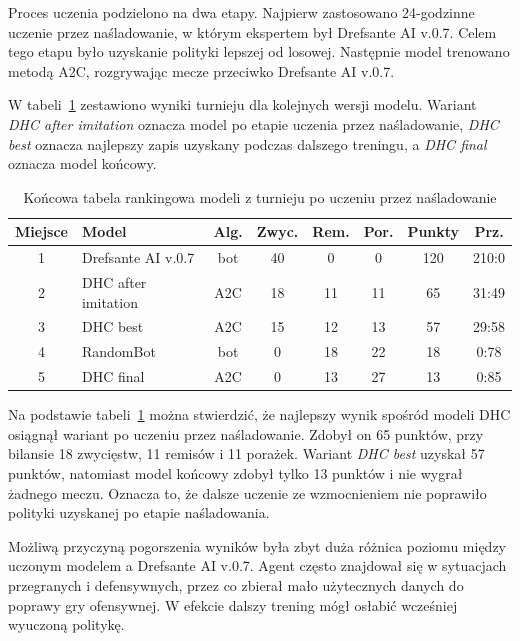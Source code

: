 Proces uczenia podzielono na dwa etapy. Najpierw zastosowano 24-godzinne uczenie przez naśladowanie, w którym ekspertem był Drefsante AI v.0.7. Celem tego etapu było uzyskanie polityki lepszej od losowej. Następnie model trenowano metodą A2C, rozgrywając mecze przeciwko Drefsante AI v.0.7.

W tabeli~\ref{tab:liga-ranking-imitation-vs-final} zestawiono wyniki turnieju dla kolejnych wersji modelu. Wariant \textit{DHC after imitation} oznacza model po etapie uczenia przez naśladowanie, \textit{DHC best} oznacza najlepszy zapis uzyskany podczas dalszego treningu, a \textit{DHC final} oznacza model końcowy.

\begin{table}[H]
	\centering
	\caption{Końcowa tabela rankingowa modeli z turnieju po uczeniu przez naśladowanie}
	\label{tab:liga-ranking-imitation-vs-final}
	\begin{tabular}{clcccccc}
		\hline
		Miejsce & Model & Alg. & Zwyc. & Rem. & Por. & Punkty & Prz. \\
		\hline
		1 & Drefsante AI v.0.7 & bot & 40 & 0 & 0 & 120 & 210:0 \\
		2 & DHC after imitation & A2C & 18 & 11 & 11 & 65 & 31:49 \\
		3 & DHC best & A2C & 15 & 12 & 13 & 57 & 29:58 \\
		4 & RandomBot & bot & 0 & 18 & 22 & 18 & 0:78 \\
		5 & DHC final & A2C & 0 & 13 & 27 & 13 & 0:85 \\
		\hline
	\end{tabular}
\end{table}

Na podstawie tabeli~\ref{tab:liga-ranking-imitation-vs-final} można stwierdzić, że najlepszy wynik spośród modeli DHC osiągnął wariant po uczeniu przez naśladowanie. Zdobył on 65 punktów, przy bilansie 18 zwycięstw, 11 remisów i 11 porażek. Wariant \textit{DHC best} uzyskał 57 punktów, natomiast model końcowy zdobył tylko 13 punktów i nie wygrał żadnego meczu. Oznacza to, że dalsze uczenie ze wzmocnieniem nie poprawiło polityki uzyskanej po etapie naśladowania.

Możliwą przyczyną pogorszenia wyników była zbyt duża różnica poziomu między uczonym modelem a Drefsante AI v.0.7. Agent często znajdował się w sytuacjach przegranych i defensywnych, przez co zbierał mało użytecznych danych do poprawy gry ofensywnej. W efekcie dalszy trening mógł osłabić wcześniej wyuczoną politykę.



